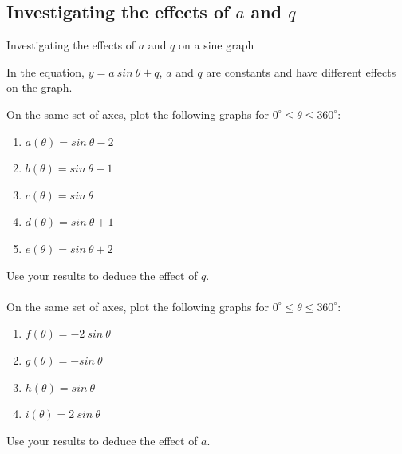 \subsection*{Investigating the effects of $a$ and $q$}
\begin{Investigation}{Investigating the effects of $a$ and $q$ on a sine graph}
{
In the equation, $y=a~sin~\theta+q$, $a$ and $q$ are constants and have different effects on the graph.\par 
 

On the same set of axes, plot the following graphs for $0^{\circ} \leq \theta \leq 360^{\circ}$:
\begin{enumerate}[noitemsep, label=\textbf{\arabic*}. ] 
\item $a(\theta )=sin~\theta -2$
\item $b(\theta )=sin~\theta -1$
\item $c(\theta )=sin~\theta $
\item $d(\theta )=sin~\theta +1$
\item $e(\theta )=sin~\theta +2$
\end{enumerate}
Use your results to deduce the effect of $q$.\\
\\
On the same set of axes, plot the following graphs for $0^{\circ} \leq \theta \leq 360^{\circ}$:
\begin{enumerate}[noitemsep, label=\textbf{\arabic*}. ] 
\item $f(\theta )=-2~sin~\theta $
\item $g(\theta )=-sin~\theta $
\item $h(\theta )=sin~\theta $
\item $i(\theta )=2~sin~\theta $\end{enumerate}
Use your results to deduce the effect of $a$.\\
}
\end{Investigation}

